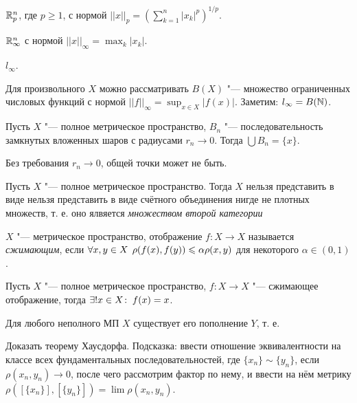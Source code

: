 \documentclass[main]{subfiles}
\begin{document}
\begin{example}
  \( \mathbb{R}^n_{p} \), где \( p \ge 1 \), с нормой
  \( ||x||_p = \left(\sum_{k=1}^n |x_k|^p \right)^{1/p} \).
\end{example}
\begin{example}
  \( \mathbb{R}^n_\infty \) с нормой \( ||x||_\infty = \max_{k} |x_k| \).
\end{example}
\begin{example}
  \( l_\infty \).
\end{example}
\begin{example}
  Для произвольного \( X \) можно рассматривать
  \( B(X) \) "--- множество ограниченных числовых функций
  с нормой \( ||f||_\infty = \sup_{x \in X} |f(x)| \).
  Заметим: \( l_\infty = B(\mathbb{N}) \).
\end{example}


\begin{theorem}
  Пусть \( X \) "--- полное метрическое пространство, \( B_n \) "---
  последовательность замкнутых вложенных шаров с радиусами
  \( r_n \to 0 \). Тогда \( \bigcup B_n = \{ x \} \).
\end{theorem}
\begin{exercise}
  Без требования \( r_n \to 0 \), общей точки может не быть.
\end{exercise}

\begin{theorem}[Бэр]
  Пусть \( X \) "--- полное метрическое пространство.
  Тогда \( X \) нельзя представить в виде
  нельзя представить в виде счётного объединения
  нигде не плотных множеств, т. е.
  оно ялвяется \emph{множеством второй категории}
\end{theorem}

\begin{definition}
  \( X \) "--- метрическое пространство, 
  отображение \( f : X \to X \) называется \emph{сжимающим},
  если \( \forall {x, y \in X} \; \, \rho(f(x), f(y)) \leqslant \alpha \rho(x, y) \)
  для некоторого \( \alpha \in (0, 1) \).
\end{definition}

\begin{theorem}
  Пусть \( X \) "--- полное метрическое пространство,
  \( f : X \to X \) "--- сжимающее отображение,
  тогда \( \exists! x \in X \colon \: f(x) = x \).
\end{theorem}

\begin{theorem}[Хаусдорф, б/д]
  Для любого неполного МП \( X \) существует его
  пополнение \( Y \), т. е. 
\end{theorem}

\begin{exercise}
  Доказать теорему Хаусдорфа. Подсказка: ввести
  отношение эквивалентности на классе всех
  фундаментальных последовательностей,
  где \( \{ x_n \} \sim \{ y_n \} \),
  если \( \rho(x_n, y_n) \to 0 \),
  после чего рассмотрим фактор по нему,
  и ввести на нём метрику
  \( \rho([\{ x_n \}], [\{ y_n \}]) = \lim \rho(x_n, y_n) \).
\end{exercise}
\end{document}
